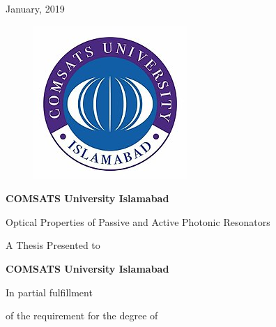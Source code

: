 \documentclass[12pt,twoside]{report}
\begin{document}
	\begin{center}
		 January, 2019
	\end{center}
	\newpage
	\noindent
	\begin{figure}
		\centering
		\includegraphics[width=0.8\linewidth]{university.jpg}
	\end{figure}
	\begin{center}
	{\Large{ \textbf{COMSATS University Islamabad}}}
	\end{center}
	
	\vspace{0.2 in}
	
	\begin{center}
		{\Large {Optical Properties of Passive and Active Photonic Resonators
		} }
	\end{center}
	\vspace{0.5 in}
	
	\begin{center}
	{A Thesis Presented to}
	\end{center}
	\vspace{0.2 in}
	\begin{center}
		{\Large {\textbf{COMSATS University Islamabad}} }
	\end{center}
	\vspace{0.5 in}
	\begin{center}
		{In partial fulfillment }
	\end{center}

	\begin{center}
		{of the requirement for the degree of}
	\end{center}
	
\end{document}
